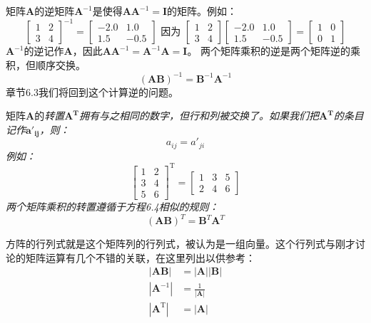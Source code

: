 \documentclass[lang=cn,12pt,marginpar=margintrue]{elegantbook}
\begin{document}
矩阵$\mathbf{A}$的逆矩阵$\mathbf{A}^{-1}$是使得$\mathbf{A}\mathbf{A}^{-1} = \mathbf{I}$的矩阵。例如：
\[
  \left[\begin{array}{ll}
      1 & 2 \\
      3 & 4
    \end{array}\right]^{-1}=\left[\begin{array}{rr}
      -2.0 & 1.0  \\
      1.5  & -0.5
    \end{array}\right] \text { 因为 }\left[\begin{array}{ll}
      1 & 2 \\
      3 & 4
    \end{array}\right]\left[\begin{array}{rr}
      -2.0 & 1.0  \\
      1.5  & -0.5
    \end{array}\right]=\left[\begin{array}{ll}
      1 & 0 \\
      0 & 1
    \end{array}\right]
\]
$\mathbf{A}^{-1}$的逆记作$\mathbf{A}$，因此$\mathbf{AA}^{-1} = \mathbf{A}^{-1}\mathbf{A} = \mathbf{I}$。
两个矩阵乘积的逆是两个矩阵逆的乘积，但顺序交换。
\begin{equation}
  (\mathbf{A B})^{-1} = \mathbf{B}^{-1} \mathbf{A}^{-1}
\end{equation}
章节6.3我们将回到这个计算逆的问题。

矩阵$\mathbf{A}$的\it{转置}$\mathbf{A^T}$拥有与之相同的数字，但行和列被交换了。如果我们把$\mathbf{A^T}$的条目记作$\mathbf{a'_{ij}}$，则：
\[
a_{ij} = a'_{ji}
\]
例如：
\[
  \left[\begin{array}{ll}
      1 & 2 \\
      3 & 4 \\
      5 & 6
    \end{array}\right]^{\mathrm{T}}=\left[\begin{array}{lll}
      1 & 3 & 5 \\
      2 & 4 & 6
    \end{array}\right]
\]
两个矩阵乘积的转置遵循于方程6.4相似的规则：\[(\mathbf{AB})^T=\mathbf{B}^T\mathbf{A}^T\]

方阵的行列式就是这个矩阵列的行列式，被认为是一组向量。这个行列式与刚才讨论的矩阵运算有几个不错的关联，在这里列出以供参考：
\begin{align}
  |\mathbf{A B}|                       & = |\mathbf{A}| |\mathbf{B}| \\
  \left|\mathbf{A}^{-1}\right|         & = \frac{1}{|\mathbf{A}|}    \\
  \left|\mathbf{A}^{\mathrm{T}}\right| & = |\mathbf{A}|
\end{align}
\end{document}
